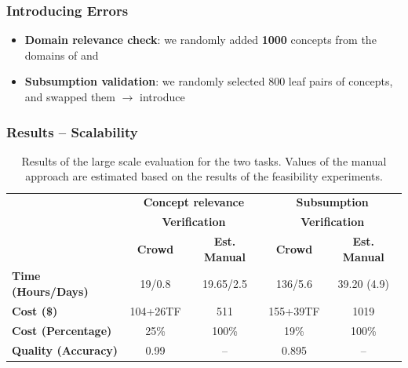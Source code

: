 \documentclass{beamer}
\begin{document}
\begin{frame}
\frametitle{Introducing Errors}
  \begin{itemize}
        \item \textbf{Domain relevance check}: we randomly added \textbf{1000} concepts from the domains of  and 
        \item \textbf{Subsumption validation}: we randomly selected 800 leaf pairs of concepts, and swapped them $\rightarrow{}$ introduce 
  \end{itemize}
\end{frame}



\begin{frame}
  \frametitle{Results -- Scalability}
\begin{table}
\small
\center
\begin{tabular}{|l|c|c|c|c|} \hline
    & \multicolumn{2}{|c|}{\textbf{Concept relevance}} & \multicolumn{2}{c|}{\textbf{Subsumption}}  \\
        & \multicolumn{2}{|c|}{\textbf{Verification}} & \multicolumn{2}{c|}{\textbf{Verification}}  \\

          \cline{2-5}
                                      & \textbf{Crowd} & \textbf{Est. Manual} & \textbf{Crowd} & \textbf{Est. Manual} \\ \hline
\textbf{Time (Hours/Days)}                &  19/0.8   &   19.65/2.5  &  136/5.6    &  39.20 (4.9)  \\ \hline
\textbf{Cost (\$)}                   &   104+26TF  & 511     &  155+39TF   &  1019    \\ \hline
\textbf{Cost (Percentage)}           &   25\% & 100\%     &  19\%   &  100\%    \\ \hline
\textbf{Quality (Accuracy)}          & 0.99 &  --   &  0.895   &  --     \\ \hline

\end{tabular}
\caption{Results of the large scale evaluation for the two tasks. Values of the manual approach are estimated based on the results of the feasibility experiments. }
\label{table:eval_scale}
\end{table}

\end{frame}
\end{document}
